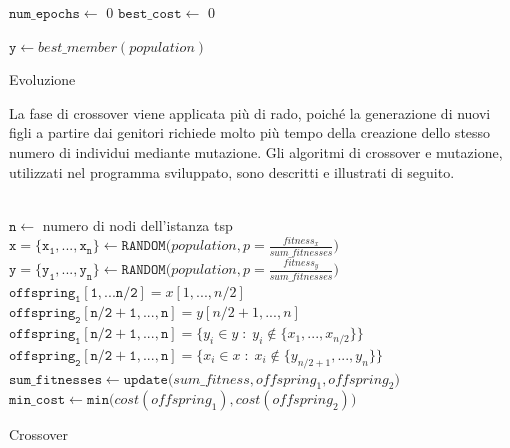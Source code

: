 \begin{algorithm}[h]
\DontPrintSemicolon
{}
\BlankLine
 $\mathtt{num\_epochs} \gets$ 0\;
 $\mathtt{best\_cost} \gets$ 0\;
 \BlankLine
 
 $\mathtt{y}\gets best\_member(population)$
 \caption{Evoluzione}
\end{algorithm}
La fase di crossover viene applicata più di rado, poiché la generazione di nuovi figli a partire dai genitori richiede molto più tempo della creazione dello stesso numero di individui mediante mutazione. Gli algoritmi di crossover e mutazione, utilizzati nel programma sviluppato, sono descritti e illustrati di seguito.\\\\
\begin{algorithm}[h]
\DontPrintSemicolon
{}
\BlankLine 
$\mathtt{n}\gets$ numero di nodi dell'istanza tsp\;
$\mathtt{x=\{x_1,...,x_n\} \gets RANDOM(}population, p=\frac{fitness_x}{sum\_fitnesses})$\;
$\mathtt{y=\{y_1,...,y_n\} \gets RANDOM(}population, p=\frac{fitness_y}{sum\_fitnesses})$\;
 \BlankLine \BlankLine
 $\mathtt{offspring_1[1,...n/2]}=x[1,..., n/2]$\;
 $\mathtt{offspring_2[n/2+1,...,n]}=y[n/2+1,..., n]$\;
 $\mathtt{offspring_1[n/2+1,...,n]}=\{y_i\in y\; :\; y_i\not\in\{x_1, ..., x_{n/2}\}\}$\;
 $\mathtt{offspring_2[n/2+1,...,n]}=\{x_i\in x\; :\; x_i\not\in\{y_{n/2+1}, ..., y_{n}\}\}$\;
  \BlankLine
  $\mathtt{sum\_fitnesses\gets update(}sum\_fitness, offspring_1, offspring_2\mathtt{)}$\;
  \BlankLine  
  $\mathtt{min\_cost \gets min(}cost(offspring_1), cost(offspring_2)\mathtt{)}$\;  
  \BlankLine
\caption{Crossover}\label{crossover_pseudo}
\end{algorithm}

